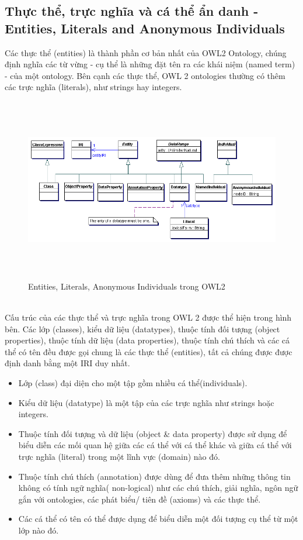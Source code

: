 \subsection{Thực thể, trực nghĩa và cá thể ẩn danh - Entities, Literals and Anonymous Individuals}
Các thực thể (entities) là thành phần cơ bản nhất của OWL2 Ontology, chúng định nghĩa các từ vừng - cụ thể là những đặt tên ra các khái niệm (named term) - của một ontology. Bên cạnh các thực thể, OWL 2 ontologies thường có thêm các trực nghĩa (literals), như strings hay integers.
\begin{figure}[ht!]
	\centering
	\includegraphics[width=150mm, height=80mm]{Figures/entities.png}
	\caption{Entities, Literals, Anonymous Individuals trong OWL2 \label{overflow}}
\end{figure}
\\
Cấu trúc của các thực thể và trực nghĩa trong OWL 2 được thể hiện trong hình bên. Các lớp (classes), kiểu dữ liệu (datatypes), thuộc tính đối tượng (object properties), thuộc tính dữ liệu (data properties), thuộc tính chú thích và các cá thể có tên đều được gọi chung là các thực thể (entities), tất cả chúng được được định danh bằng một IRI duy nhất. 
\begin{itemize}
\item Lớp (class) đại diện cho một tập gồm nhiều cá thể(individuals).
\item Kiểu dữ liệu (datatype) là một tập của các trực nghĩa như strings hoặc integers.
\item Thuộc tính đối tượng và dữ liệu (object \& data property) được sử dụng để biểu diễn các mối quan hệ giữa các cá thể với cá thể khác và giữa cá thể với trực nghĩa (literal) trong một lĩnh vực (domain) nào đó.
\item Thuộc tính chú thích (annotation) được dùng để đưa thêm những thông tin không có tính ngữ nghĩa( non-logical) như các chú thích, giải nghĩa, ngôn ngữ gắn với ontologies, các phát biểu/ tiên đề (axioms) và các thực thể.
\item  Các cá thể có tên có thể được dụng để biểu diễn một đối tượng cụ thể từ một lớp nào đó.
\end{itemize}
